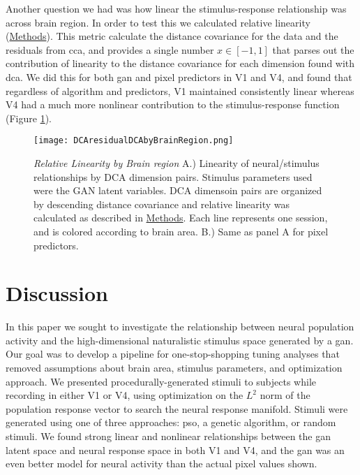 Another question we had was how linear the stimulus-response relationship was across brain region. In order to test this we calculated relative linearity (\hyperref[{methods:relativeLinearity}]{Methods}). This metric calculate the distance covariance for the data and the residuals from \gls{cca}, and provides a single number $x \in [-1,1]$ that parses out the contribution of linearity to the distance covariance for each dimension found with \gls{dca}. We did this for both \gls{gan} and pixel predictors in V1 and V4, and found that regardless of algorithm and predictors, V1 maintained consistently linear whereas V4 had a much more nonlinear contribution to the stimulus-response function (Figure \ref{fig:dcaLinearity}).
	
\begin{figure}
	\centering
	\texttt{[image: DCAresidualDCAbyBrainRegion.png]}
	{\caption{{\it Relative Linearity by Brain region} A.) Linearity of neural/stimulus relationships by DCA dimension pairs. Stimulus parameters used were the GAN latent variables. DCA dimensoin pairs are organized by descending distance covariance and relative linearity was calculated as described in \hyperref[{methods:relativeLinearity}]{Methods}. Each line represents one session, and is colored according to brain area. B.) Same as panel A for pixel predictors.}
	\label{fig:dcaLinearity}}
\end{figure}
	


\section{Discussion}
\glsresetall
In this paper we sought to investigate the relationship between neural population activity and the high-dimensional naturalistic stimulus space generated by a \gls{gan}. Our goal was to develop a pipeline for one-stop-shopping tuning analyses that removed assumptions about brain area, stimulus parameters, and optimization approach. We presented procedurally-generated stimuli to subjects while recording in either V1 or V4, using optimization on the $L^2$ norm of the population response vector to search the neural response manifold. Stimuli were generated using one of three approaches: \gls{pso}, a genetic algorithm, or random stimuli. We found strong linear and nonlinear relationships between the \gls{gan} latent space and neural response space in both V1 and V4, and the \gls{gan} was an even better model for neural activity than the actual pixel values shown.


